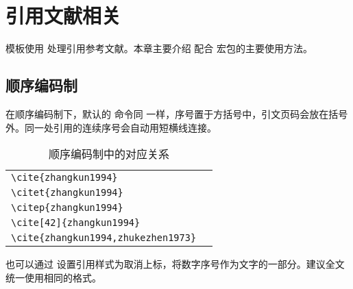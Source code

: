 \documentclass[report, twoside, UTF8, AutoFakeBold = 1, AutoFakeSlant, zihao = -4]{config}
\begin{document}
\chapter{引用文献相关}

模板使用  处理引用参考文献。本章主要介绍  配合  宏包的主要使用方法\cite{zhangkun1994,zhukezhen1973,dupont1974bone,zhengkaiqing1987,jiangxizhou1980,jianduju1994,merkt1995rotational,mellinger1996laser,bixon1996dynamics,mahui1995,carlson1981two,taylor1983scanning,taylor1981study,shimizu1983laser,atkinson1982experimental,kusch1975perturbations,guangxi1993,huosini1989guwu,wangfuzhi1865songlun,zhaoyaodong1998xinshidai,biaozhunhua2002tushu,chubanzhuanye2004,who1970factors,peebles2001probability,baishunong1998zhiwu,weinstein1974pathogenic,hanjiren1985lun,dizhi1936dizhi,tushuguan1957tushuguanxue,aaas1883science,fugang2000fengsha,xiaoyu2001chubanye,oclc2000about,scitor2000project}。

\section{顺序编码制}

在顺序编码制下，默认的  命令同  一样，序号置于方括号中，引文页码会放在括号外。同一处引用的连续序号会自动用短横线连接。

\begin{table}[H]
  \centering
  \caption{顺序编码制中的对应关系}
      \begin{tabular}{l@{\quad$\Rightarrow$\quad}l}
      \verb|\cite{zhangkun1994}|               & \cite{zhangkun1994}               \\
      \verb|\citet{zhangkun1994}|              & \citet{zhangkun1994}              \\
      \verb|\citep{zhangkun1994}|              & \citep{zhangkun1994}              \\
      \verb|\cite[42]{zhangkun1994}|           & \cite[42]{zhangkun1994}           \\
      \verb|\cite{zhangkun1994,zhukezhen1973}| & \cite{zhangkun1994,zhukezhen1973} \\
      \end{tabular}
\end{table}

也可以通过  设置引用样式为取消上标，将数字序号作为文字的一部分。建议全文统一使用相同的格式。

\end{document}
